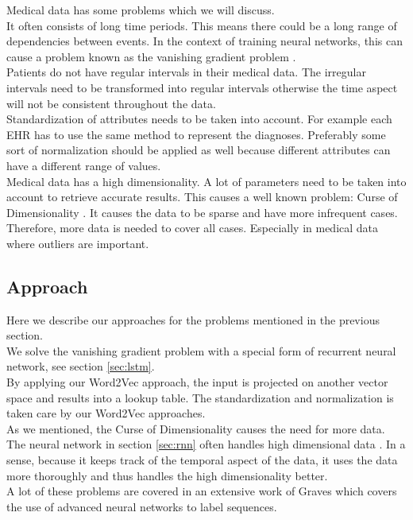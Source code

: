 Medical data has some problems which we will discuss.\\
It often consists of long time periods. This means there could be a long range of dependencies between events. In the context of training neural networks, this can cause a problem known as the vanishing gradient problem \cite{vanishingproblem:article}. \\
Patients do not have regular intervals in their medical data. The irregular intervals need to be transformed into regular intervals otherwise the time aspect will not be consistent throughout the data. \\
Standardization of attributes needs to be taken into account. For example each EHR has to use the same method to represent the diagnoses. Preferably some sort of normalization should be applied as well because different attributes can have a different range of values. \\
Medical data has a high dimensionality. A lot of parameters need to be taken into account to retrieve accurate results. This causes a well known problem: Curse of Dimensionality \cite {curseofdim:book}. It causes the data to be sparse and have more infrequent cases. Therefore, more data is needed to cover all cases. Especially in medical data where outliers are important. 


\subsection{Approach}

Here we describe our approaches for the problems mentioned in the previous section. \\
We solve the vanishing gradient problem with a special form of recurrent neural network, see section \ref{sec:lstm}. \\
By applying our Word2Vec approach, the input is projected on another vector space and results into a lookup table. The standardization and normalization is taken care by our Word2Vec approaches. \\
As we mentioned, the Curse of Dimensionality causes the need for more data. The neural network in section \ref{sec:rnn} often handles high dimensional data \cite{nn1:article} \cite{nn2:article} \cite{nn3:article} \cite{nn4:article}. In a sense, because it keeps track of the temporal aspect of the data, it uses the data more thoroughly and thus handles the high dimensionality better. \\

A lot of these problems are covered in an extensive work of Graves \cite{gravesLstm:thesis} which covers the use of advanced neural networks to label sequences.


